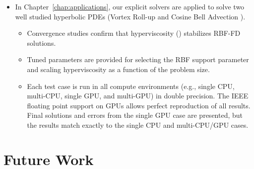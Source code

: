 \begin{itemize}
\item In Chapter~\ref{chap:applications}, our explicit solvers are applied to solve two well studied hyperbolic PDEs (Vortex Roll-up \cite{NairTransport05, NairJablonowski08} and Cosine Bell Advection \cite{JakobChien1995}).
\begin{itemize} 
\item Convergence studies confirm that hyperviscosity (\cite{Fornberg2011b}) stabilizes RBF-FD solutions.
\item Tuned parameters are provided for selecting the RBF support parameter and scaling hyperviscosity as a function of the problem size.
\item Each test case is run in all compute environments (e.g., single CPU, multi-CPU, single GPU, and multi-GPU) in double precision. The IEEE floating point support on GPUs allows perfect reproduction of all results. Final solutions and errors from the single GPU case are presented, but the results match exactly to the single CPU and multi-CPU/GPU cases. 
\end{itemize}

\end{itemize} 



\section{Future Work}


